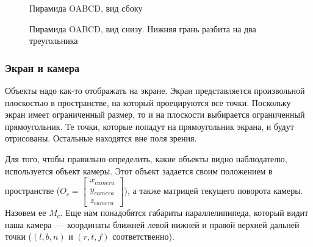 \documentclass{article}
\begin{document}
\begin{center}
\begin{figure}[h]
\caption{Пирамида OABCD, вид сбоку}
\label{ris:image}
\end{figure}
\begin{figure}[h]
\caption{Пирамида OABCD, вид снизу. Нижняя грань разбита на два треугольника}
\label{ris:image}
\end{figure}
\end{center}

\subsubsection{Экран и камера}

Объекты надо как-то отображать на экране. Экран представляется произвольной плоскостью в пространстве, на который проецируются все точки. Поскольку экран имеет ограниченный размер, то и на плоскости выбирается ограниченный прямоугольник. Те точки, которые попадут на прямоугольник экрана, и будут отрисованы. Остальные находятся вне поля зрения.

Для того, чтобы правильно определить, какие объекты видно наблюдателю, используется объект камеры. Этот объект задается своим положением в пространстве ($O_c =  \begin{bmatrix} x_{camera} \\ y_{camera} \\ z_{camera} \end{bmatrix}$), а также матрицей текущего поворота камеры. Назовем ее $M_c$. Еще нам понадобятся габариты параллелипипеда, который видит наша камера~--- координаты ближней левой нижней и правой верхней дальней точки ($(l, b, n)$ и $(r, t, f)$ соответственно).
\end{document}
